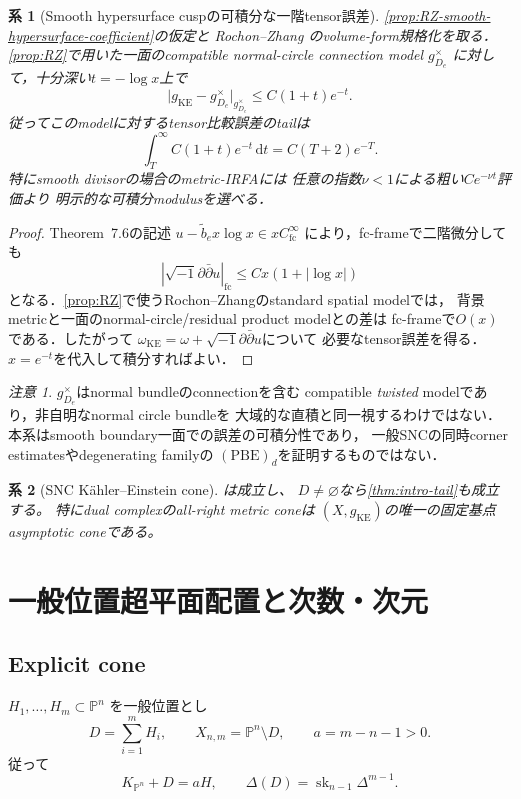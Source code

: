 \documentclass[11pt,a4paper]{ltjsarticle}
\newcommand{\PP}{\mathbb P}
\newcommand{\dd}{\mathrm d}
\newcommand{\sk}{\operatorname{sk}}
\theoremstyle{plain}
\newtheorem{corollary}[corollary]{系}
\theoremstyle{definition}
\theoremstyle{remark}
\newtheorem{remark}[remark]{注意}
\begin{document}
\begin{corollary}[Smooth hypersurface cuspの可積分な一階tensor誤差]
\label{cor:RZ-smooth-sharp-IRFA}
\cref{prop:RZ-smooth-hypersurface-coefficient}の仮定と
Rochon--Zhang \cite[Theorem~7.6]{RochonZhang} のvolume-form規格化を取る．
\cref{prop:RZ}で用いた一面のcompatible normal-circle connection model
$g^\times_{D_e}$ に対して，十分深い$t=-\log x$上で
\[
 \bigl|g_{\mathrm{KE}}-g^\times_{D_e}\bigr|_{g^\times_{D_e}}
 \le C(1+t)e^{-t}.
\]
従ってこのmodelに対するtensor比較誤差のtailは
\[
 \int_T^\infty C(1+t)e^{-t}\,\dd t
 =C(T+2)e^{-T}.
\]
特にsmooth divisorの場合のmetric-IRFAには
任意の指数$\nu<1$による粗い$Ce^{-\nu t}$評価より
明示的な可積分modulusを選べる．
\end{corollary}
\begin{proof}
Theorem~7.6の記述
$u-\widetilde b_e x\log x\in xC^\infty_{\mathrm{fc}}$
により，fc-frameで二階微分しても
\[
 |\sqrt{-1}\partial\bar\partial u|_{\mathrm{fc}}
 \le Cx(1+|\log x|)
\]
となる．\cref{prop:RZ}で使うRochon--Zhangのstandard spatial modelでは，
背景metricと一面のnormal-circle/residual product modelとの差は
fc-frameで$O(x)$である．したがって
$\omega_{\mathrm{KE}}=\omega+\sqrt{-1}\partial\bar\partial u$について
必要なtensor誤差を得る．$x=e^{-t}$を代入して積分すればよい．
\end{proof}
\begin{remark}
$g^\times_{D_e}$はnormal bundleのconnectionを含む
compatible \emph{twisted} modelであり，非自明なnormal circle bundleを
大域的な直積と同一視するわけではない．
本系はsmooth boundary一面での誤差の可積分性であり，
一般SNCの同時corner estimatesやdegenerating familyの
$(\mathrm{PBE})_d$を証明するものではない．
\end{remark}

\begin{corollary}[SNC K\"ahler--Einstein cone]
\label{cor:SNC}
は成立し、
$D\ne\varnothing$なら\cref{thm:intro-tail}も成立する。
特にdual complexのall-right metric coneは
$(X,g_{\mathrm{KE}})$の唯一の固定基点asymptotic coneである。
\end{corollary}

\section{一般位置超平面配置と次数・次元}
\label{sec:arrangements}

\subsection{Explicit cone}
$H_1,\ldots,H_m\subset\PP^n$ を一般位置とし
\[
 D=\sum_{i=1}^mH_i,
 \qquad X_{n,m}=\PP^n\setminus D,
 \qquad a=m-n-1>0.
\]
従って
\[
 K_{\PP^n}+D=aH,
 \qquad
 \Delta(D)=\sk_{n-1}\Delta^{m-1}.
\]
\end{document}
